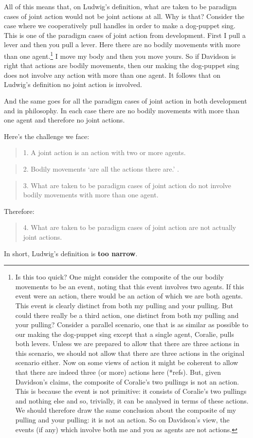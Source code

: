 \documentclass[12pt,a4paper]{extarticle}
\begin{document}
All of this means that, on Ludwig's definition, what are taken to be paradigm cases of joint action would not be joint actions at all.
Why is that?
Consider the case where we cooperatively pull handles in order to make a dog-puppet sing.
This is one of the paradigm cases of joint action from development.
First I pull a lever and then you pull a lever.
Here there are no bodily movements with more than one agent.\footnote{
Is this too quick?  
One might consider the composite of the our bodily movements to be an event, noting that this event involves two agents.
If this event were an action, there would be an action of which we are both agents.
This event is clearly distinct from both my pulling and your pulling.
But could there really be a third action, one distinct from both my pulling and your pulling?
Consider a parallel scenario, one that is as similar as possible to our making the dog-puppet sing except that a single agent, Coralie, pulls both levers.
Unless we are prepared to allow that there are three actions in this scenario, we should not allow that there are three actions in the original scenario either.
Now on some views of action it might be coherent to allow that there are indeed three (or more) actions here (*refs).
But, given Davidson's claims, the composite of Coralie's two pullings is not an action.
This is because the event is not primitive: it consists of Coralie's two pullings and nothing else and so, trivially, it can be analysed in terms of these actions.
We should therefore draw the same conclusion about the composite of my pulling and your pulling: it is not an action.
So on Davidson's view, the events (if any) which involve both me and you as agents are not actions.
}
I move my body and then you move yours.
So if Davidson is right that actions are bodily movements, then our making the dog-puppet sing does not involve any action with more than one agent.
It follows that on Ludwig's definition no joint action is involved.

And the same goes for all the paradigm cases of joint action in both development and in philosophy.
In each case there are no bodily movements with more than one agent and therefore no joint actions.

Here's the challenge we face:
%
\begin{quote}
1. A joint action is an action with two or more agents.
\end{quote}
%
%
\begin{quote}
2. Bodily movements `are all the actions there are.'
\citep[p.\ 59]{Davidson:1971fz}.
\end{quote}
%
%
\begin{quote}
3. What are taken to be paradigm cases of joint action do not involve bodily movements with more than one agent.
\end{quote}
%
Therefore:
%
\begin{quote}
4. What are taken to be paradigm cases of joint action are not actually joint actions.
\end{quote}
%
In short, Ludwig's definition is \textbf{too narrow}.
\end{document}
